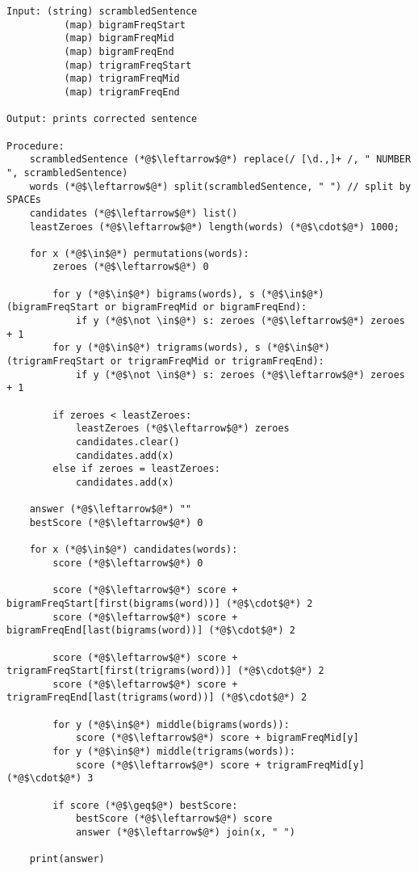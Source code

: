 \documentclass[a4paper,11pt]{article}
\begin{document}
\begin{lstlisting}[language=algolur]
Input: (string) scrambledSentence
          (map) bigramFreqStart
          (map) bigramFreqMid
          (map) bigramFreqEnd
          (map) trigramFreqStart
          (map) trigramFreqMid
          (map) trigramFreqEnd

Output: prints corrected sentence

Procedure:
    scrambledSentence (*@$\leftarrow$@*) replace(/ [\d.,]+ /, " NUMBER ", scrambledSentence)
    words (*@$\leftarrow$@*) split(scrambledSentence, " ") // split by SPACEs
    candidates (*@$\leftarrow$@*) list()
    leastZeroes (*@$\leftarrow$@*) length(words) (*@$\cdot$@*) 1000;
    
    for x (*@$\in$@*) permutations(words):
        zeroes (*@$\leftarrow$@*) 0
        
        for y (*@$\in$@*) bigrams(words), s (*@$\in$@*) (bigramFreqStart or bigramFreqMid or bigramFreqEnd):
            if y (*@$\not \in$@*) s: zeroes (*@$\leftarrow$@*) zeroes + 1
        for y (*@$\in$@*) trigrams(words), s (*@$\in$@*) (trigramFreqStart or trigramFreqMid or trigramFreqEnd):
            if y (*@$\not \in$@*) s: zeroes (*@$\leftarrow$@*) zeroes + 1
        
        if zeroes < leastZeroes:
            leastZeroes (*@$\leftarrow$@*) zeroes
            candidates.clear()
            candidates.add(x)
        else if zeroes = leastZeroes:
            candidates.add(x)
    
    answer (*@$\leftarrow$@*) ""
    bestScore (*@$\leftarrow$@*) 0
    
    for x (*@$\in$@*) candidates(words):
        score (*@$\leftarrow$@*) 0
        
        score (*@$\leftarrow$@*) score + bigramFreqStart[first(bigrams(word))] (*@$\cdot$@*) 2
        score (*@$\leftarrow$@*) score + bigramFreqEnd[last(bigrams(word))] (*@$\cdot$@*) 2
        
        score (*@$\leftarrow$@*) score + trigramFreqStart[first(trigrams(word))] (*@$\cdot$@*) 2
        score (*@$\leftarrow$@*) score + trigramFreqEnd[last(trigrams(word))] (*@$\cdot$@*) 2
        
        for y (*@$\in$@*) middle(bigrams(words)):
            score (*@$\leftarrow$@*) score + bigramFreqMid[y]
        for y (*@$\in$@*) middle(trigrams(words)):
            score (*@$\leftarrow$@*) score + trigramFreqMid[y] (*@$\cdot$@*) 3
        
        if score (*@$\geq$@*) bestScore:
            bestScore (*@$\leftarrow$@*) score
            answer (*@$\leftarrow$@*) join(x, " ")
    
    print(answer)
\end{lstlisting}
\end{document}
